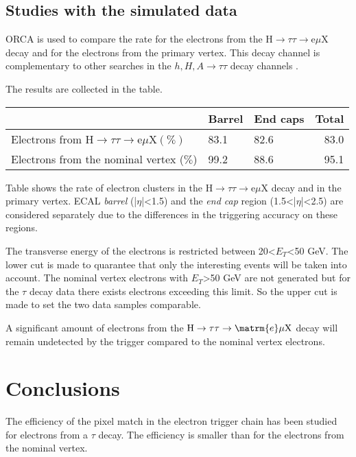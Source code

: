 \documentclass[a4paper,12pt,titlepage]{article}
\begin{document}
\subsection{Studies with the simulated data}
ORCA is used to compare the rate for the electrons from the $\mathrm{H} \rightarrow \tau \tau \rightarrow \mathrm{e} \mu \mathrm{X}$ decay and for the electrons from the primary vertex. This decay channel is complementary to other searches in the $h, H, A \rightarrow \tau \tau$ decay channels \cite{CMSCR00:009, eemyydec}. 

The results are collected in the table.

\begin{centre}
  \begin{tabular}{|l||l|l|r|}
    \hline
    & Barrel & End caps & Total \\ \hline
    Electrons from $\mathrm{H} \rightarrow \tau \tau \rightarrow \mathrm{e} \mu \mathrm{X} (\%)$ & 83.1 & 82.6 & 83.0 \\ \hline
    Electrons from the nominal vertex ($\%$) & 99.2 & 88.6 & 95.1 \\ \hline
  \end{tabular}
\end{centre}
\linebreak

Table shows the rate of electron clusters in the $\mathrm{H} \rightarrow \tau \tau \rightarrow \mathrm{e} \mu \mathrm{X}$ decay and in the primary vertex. ECAL \emph{barrel} (|$\eta$|<1.5) and the \emph{end cap} region (1.5<|$\eta$|<2.5) are considered separately due to the differences in the triggering accuracy on these regions.

The transverse energy of the electrons is restricted between 20<$E_T$<50 GeV. The lower cut is made to quarantee that only the interesting events will be taken into account. The nominal vertex electrons with $E_T$>50 GeV are not generated but for the $\tau$ decay data there exists electrons exceeding this limit. So the upper cut is made to set the two data samples comparable.

A significant amount of electrons from the $\mathrm{H} \rightarrow \tau \tau \rightarrow \matrm{e}\mu\mathrm{X}$ decay will remain undetected by the trigger compared to the nominal vertex electrons. 

\section{Conclusions}
The efficiency of the pixel match in the electron trigger chain has been studied for electrons from a $\tau$ decay. The efficiency is smaller than for the electrons from the nominal vertex.
\end{document}
